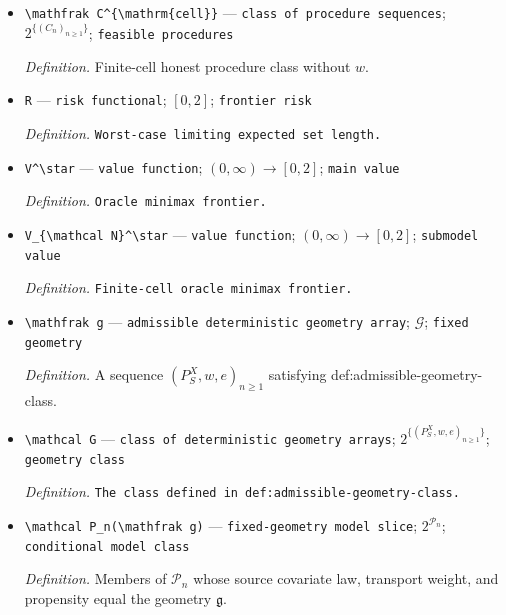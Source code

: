 \documentclass{article}
\begin{document}
\begin{itemize}
  \item \texttt{\textbackslash{}\allowbreak{}mathfrak C\textasciicircum{}\{\textbackslash{}\allowbreak{}mathrm\{cell\}\allowbreak{}\}\allowbreak{}} --- \texttt{class of procedure sequences}; \(2^{\{(C_n)_{n\ge1}\}}\); \texttt{feasible procedures}
  \par\smallskip\noindent\emph{Definition.} Finite-cell honest procedure class without \(w\).
  \item \texttt{R} --- \texttt{risk functional}; \([0,2]\); \texttt{frontier risk}
  \par\smallskip\noindent\emph{Definition.} \texttt{Worst-\allowbreak{}case limiting expected set length.}
  \item \texttt{V\textasciicircum{}\textbackslash{}\allowbreak{}star} --- \texttt{value function}; \((0,\infty)\to[0,2]\); \texttt{main value}
  \par\smallskip\noindent\emph{Definition.} \texttt{Oracle minimax frontier.}
  \item \texttt{V\_\allowbreak{}\{\textbackslash{}\allowbreak{}mathcal N\}\allowbreak{}\textasciicircum{}\textbackslash{}\allowbreak{}star} --- \texttt{value function}; \((0,\infty)\to[0,2]\); \texttt{submodel value}
  \par\smallskip\noindent\emph{Definition.} \texttt{Finite-\allowbreak{}cell oracle minimax frontier.}
  \item \texttt{\textbackslash{}\allowbreak{}mathfrak g} --- \texttt{admissible deterministic geometry array}; \(\mathcal G\); \texttt{fixed geometry}
  \par\smallskip\noindent\emph{Definition.} A sequence \((P_S^X,w,e)_{n\ge1}\) satisfying def:admissible-geometry-class.
  \item \texttt{\textbackslash{}\allowbreak{}mathcal G} --- \texttt{class of deterministic geometry arrays}; \(2^{\{(P_S^X,w,e)_{n\ge1}\}}\); \texttt{geometry class}
  \par\smallskip\noindent\emph{Definition.} \texttt{The class defined in def:\allowbreak{}admissible-\allowbreak{}geometry-\allowbreak{}class.}
  \item \texttt{\textbackslash{}\allowbreak{}mathcal P\_\allowbreak{}n(\textbackslash{}\allowbreak{}mathfrak g)} --- \texttt{fixed-\allowbreak{}geometry model slice}; \(2^{\mathcal P_n}\); \texttt{conditional model class}
  \par\smallskip\noindent\emph{Definition.} Members of \(\mathcal P_n\) whose source covariate law, transport weight, and propensity equal the geometry \(\mathfrak g\).

\end{itemize}
\end{document}
